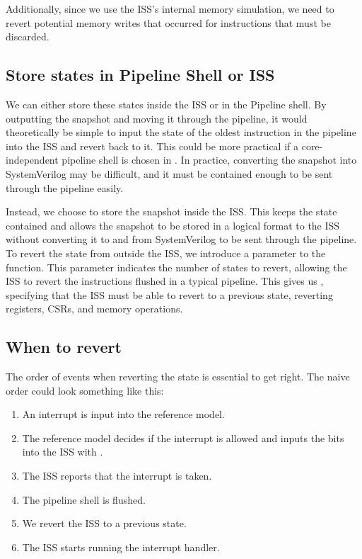 Additionally, since we use the ISS's internal memory simulation, we need to revert potential memory writes that occurred for instructions that must be discarded.


\subsection{Store states in Pipeline Shell or ISS}

We can either store these states inside the ISS or in the Pipeline shell. By outputting the snapshot and moving it through the pipeline, it would theoretically be simple to input the state of the oldest instruction in the pipeline into the ISS and revert back to it. This could be more practical if a core-independent pipeline shell is chosen in . In practice, converting the snapshot into SystemVerilog may be difficult, and it must be contained enough to be sent through the pipeline easily. %

Instead, we choose to store the snapshot inside the ISS. This keeps the state contained and allows the snapshot to be stored in a logical format to the ISS without converting it to and from SystemVerilog to be sent through the pipeline. 
To revert the state from outside the ISS, we introduce a  parameter to the  function. This parameter indicates the number of states to revert, allowing the ISS to revert the instructions flushed in a typical pipeline.
This gives us \textbf{}, specifying that the ISS must be able to revert to a previous state, reverting registers, CSRs, and memory operations.

\subsection{When to revert}

The order of events when reverting the state is essential to get right.
The naive order could look something like this:

\begin{enumerate}
    \item An interrupt is input into the reference model.
    \item The reference model decides if the interrupt is allowed and inputs the  bits into the ISS with .
    \item The ISS reports that the interrupt is taken.
    \item The pipeline shell is flushed.
    \item We revert the ISS to a previous state.
    \item The ISS starts running the interrupt handler.
\end{enumerate}

